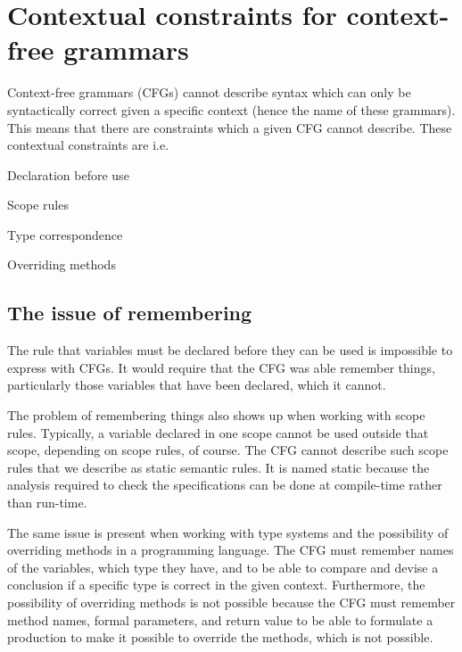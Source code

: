 \section{Contextual constraints for context-free grammars}
\label{sec:contextualconstraints}

Context-free grammars (CFGs) cannot describe syntax which can only be
syntactically correct given a specific context (hence the name of these
grammars). This means that there are constraints which a given CFG cannot
describe.
These contextual constraints are i.e.\:
\cite[p. 39]{plpp}

\begin{dlist}
\item Declaration before use
\item Scope rules
\item Type correspondence
\item Overriding methods
\end{dlist}


\subsection{The issue of remembering}

The rule that variables must be declared before they can be used is impossible
to express with CFGs. It would require that the CFG was able remember things,
particularly those variables that have been declared, which it cannot. 

The problem of remembering things also shows up when working with
scope rules. Typically, a variable declared in one scope cannot be
used outside that scope, depending on scope rules, of course. The CFG
cannot describe such scope rules that we describe as static semantic
rules. It is named static because the analysis required to check the
specifications can be done at compile-time rather than run-time.
\cite[p. 153]{sebesta2013}

The same issue is present when working with type systems and the
possibility of overriding methods in a programming language. The CFG
must remember names of the variables, which type they have, and to be
able to compare and devise a conclusion if a specific type is correct in
the given context. Furthermore, the possibility of overriding methods
is not possible because the CFG must remember method names, formal
parameters, and return value to be able to formulate a production to
make it possible to override the methods, which is not possible.

